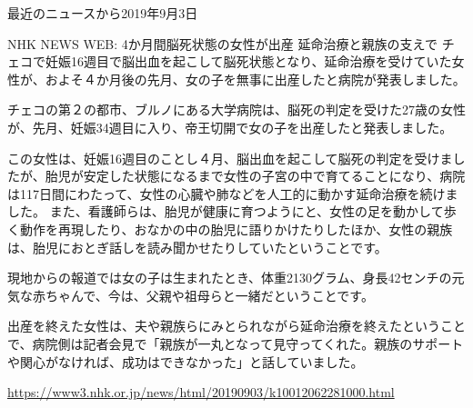 \documentclass[10pt, dvipdfmx]{beamer}
\begin{document}
\begin{frame}{最近のニュースから\hfill 2019年9月3日}

\begin{block}{NHK NEWS WEB: 4か月間脳死状態の女性が出産 延命治療と親族の支えで}
チェコで妊娠16週目で脳出血を起こして脳死状態となり、延命治療を受けていた女性が、およそ４か月後の先月、女の子を無事に出産したと病院が発表しました。

チェコの第２の都市、ブルノにある大学病院は、脳死の判定を受けた27歳の女性が、先月、妊娠34週目に入り、帝王切開で女の子を出産したと発表しました。

この女性は、妊娠16週目のことし４月、脳出血を起こして脳死の判定を受けましたが、胎児が安定した状態になるまで女性の子宮の中で育てることになり、病院は117日間にわたって、女性の心臓や肺などを人工的に動かす延命治療を続けました。
また、看護師らは、胎児が健康に育つようにと、女性の足を動かして歩く動作を再現したり、おなかの中の胎児に語りかけたりしたほか、女性の親族は、胎児におとぎ話しを読み聞かせたりしていたということです。

現地からの報道では女の子は生まれたとき、体重2130グラム、身長42センチの元気な赤ちゃんで、今は、父親や祖母らと一緒だということです。

出産を終えた女性は、夫や親族らにみとられながら延命治療を終えたということで、病院側は記者会見で「親族が一丸となって見守ってくれた。親族のサポートや関心がなければ、成功はできなかった」と話していました。

\url{https://www3.nhk.or.jp/news/html/20190903/k10012062281000.html}
\end{block}

%
%
\end{frame}
\end{document}
